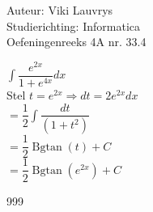 \documentclass[a4paper]{article}
\begin{document}
  
\noindent \large Auteur: Viki	Lauvrys \\
\noindent \large Studierichting: Informatica\\
\noindent \large Oefeningenreeks 4A nr. 33.4\\

\medskip

\normalsize

$ \displaystyle\int \dfrac{e^{2x}}{1 + e^{4x}}dx $ \\

Stel $ t = e^{2x} \Rightarrow dt = 2e^{2x} dx $ \\

$ = \dfrac{1}{2} \displaystyle\int \dfrac{dt}{(1 + t^2)}$ \\

$ = \dfrac{1}{2} \operatorname{Bgtan}(t) + C $ \\

$ = \dfrac{1}{2} \operatorname{Bgtan} \left( e^{2x} \right) + C $ \\

\begin{thebibliography}{999}
\end{thebibliography}
\end{document}

